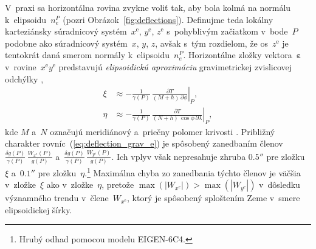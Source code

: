 \documentclass[a4paper, 12pt]{book}
\begin{document}
V~praxi sa horizontálna rovina zvykne voliť tak, aby bola kolmá na normálu 
k~elipsoidu~$n_e^P$ (pozri Obrázok~\ref{fig:deflections}).  Definujme teda 
lokálny karteziánsky súradnicový systém~$x^\mathrm{e}$, $y^\mathrm{e}$, 
$z^\mathrm{e}$ s~pohyblivým začiatkom v~bode~$P$ podobne ako súradnicový 
systém~$x$, $y$, $z$, avšak s~tým rozdielom, že os~$z^\mathrm{e}$ je tentokrát 
daná smerom normály k~elipsoidu~$n_e^P$.  Horizontálne zložky 
vektora~$\boldsymbol\varepsilon$ v~rovine~$x^\mathrm{e}y^\mathrm{e}$ 
predstavujú \emph{elipsoidickú aproximáciu} gravimetrickej zvislicovej odchýlky 
\parencite{Jekeli1999b},
%
\begin{equation}
\label{eq:deflection_grav_e}
\begin{split}
\xi &\approx -\frac{1}{\gamma(P)} \, \left.\frac{\partial T}{(M + h) \, 
\partial \phi}\right|_P{,}\\
%
\eta &\approx -\frac{1}{\gamma(P)} \, \left.\frac{\partial T}{(N + h) \, 
\cos\phi \, \partial \lambda}\right|_P{,}
\end{split}
\end{equation}
%
kde $M$ a~$N$ označujú meridiánový a~priečny polomer krivosti \parencite[pozri 
napríklad][]{MoritzPhysicalGeodesy}.  Približný charakter 
rovníc~(\ref{eq:deflection_grav_e}) je spôsobený zanedbaním 
členov~$\frac{\delta g(P)}{\gamma(P)} \, \frac{W_{x^\mathrm{e}}(P)}{g(P)}$ 
a~$\frac{\delta g(P)}{\gamma(P)} \, \frac{W_{y^\mathrm{e}}(P)}{g(P)}$.  Ich 
vplyv však nepresahuje zhruba $0.5''$ pre zložku~$\xi$ a~$0.1''$ pre 
zložku~$\eta$.\footnote{Hrubý odhad pomocou modelu EIGEN-6C4.}  Maximálna chyba 
zo zanedbania týchto členov je väčšia v~zložke~$\xi$ ako v~zložke~$\eta$, 
pretože $\max(|W_{x^\mathrm{e}}|) > \max(|W_{y^\mathrm{e}}|)$ v~dôsledku 
významného trendu v~člene~$W_{x^\mathrm{e}}$, ktorý je spôsobený sploštením 
Zeme v~smere elipsoidickej šírky.
\end{document}
